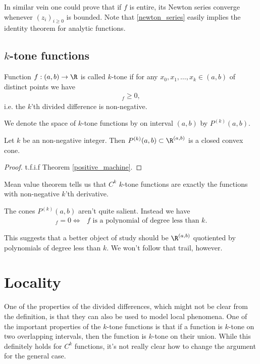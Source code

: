 In similar vein one could prove that if $f$ is entire, its Newton series converge whenever $(z_{i})_{i \geq 0}$ is bounded. Note that \ref{newton_series} easily implies the identity theorem for analytic functions.


\subsection{$k$-tone functions}

\begin{maar}
	Function $f : (a, b) \to \R$ is called $k$-tone if for any $x_{0}, x_{1}, \ldots, x_{k} \in (a, b)$ of distinct points we have
	\begin{align*}
		[x_{0}, x_{1}, \ldots, x_{k}]_{f} \geq 0,
	\end{align*}
	i.e. the $k$'th divided difference is non-negative.
\end{maar}

We denote the space of $k$-tone functions by on interval $(a, b)$ by $P^{(k)}(a, b)$.

\begin{lause}
	Let $k$ be an non-negative integer. Then $P^{(k)}(a, b) \subset \R^{(a, b)}$ is a closed convex cone.
\end{lause}
\begin{proof}
	t.f.i.f Theorem \ref{positive_machine}.
\end{proof}

Mean value theorem tells us that $C^{k}$ $k$-tone functions are exactly the functions with non-negative $k$'th derivative.

The cones $P^{(k)}(a, b)$ aren't quite salient. Instead we have
\begin{align*}
	[\cdot, \cdot, \ldots, \cdot]_{f} = 0 \Leftrightarrow \text{ $f$ is a polynomial of degree less than $k$}.
\end{align*}

This suggests that a better object of study should be $\R^{(a, b)}$ quotiented by polynomials of degree less than $k$. We won't follow that trail, however.

\section{Locality}

One of the properties of the divided differences, which might not be clear from the definition, is that they can also be used to model local phenomena. One of the important properties of the $k$-tone functions is that if a function is $k$-tone on two overlapping intervals, then the function is $k$-tone on their union. While this definitely holds for $C^{k}$ functions, it's not really clear how to change the argument for the general case.

